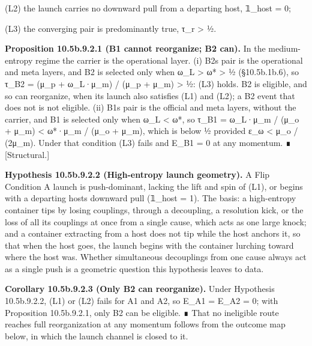 \documentclass[
]{article}
\begin{document}
(L2) the launch carries no downward pull from a departing host, 𝟙\_host
= 0;

(L3) the converging pair is predominantly true, τ\_r \textgreater{} ½.

\textbf{Proposition 10.5b.9.2.1 (B1 cannot reorganize; B2 can).} In the
medium-entropy regime the carrier is the operational layer. (i)
B2\textquotesingle s pair is the operational and meta layers, and B2 is
selected only when ω\_L \textgreater{} ω* \textgreater{} ½
(§10.5b.1b.6), so τ\_B2 = (μ\_p + ω\_L·μ\_m) / (μ\_p + μ\_m)
\textgreater{} ½: (L3) holds. B2 is eligible, and so can reorganize,
when its launch also satisfies (L1) and (L2); a B2 event that does not
is not eligible. (ii) B1\textquotesingle s pair is the official and meta
layers, without the carrier, and B1 is selected only when ω\_L
\textless{} ω*, so τ\_B1 = ω\_L·μ\_m / (μ\_o + μ\_m) \textless{} ω*·μ\_m
/ (μ\_o + μ\_m), which is below ½ provided ε\_ω \textless{} μ\_o /
(2μ\_m). Under that condition (L3) fails and E\_B1 = 0 at any momentum.
∎ {[}Structural.{]}

\textbf{Hypothesis 10.5b.9.2.2 (High-entropy launch geometry).} A Flip
Condition A launch is push-dominant, lacking the lift and spin of (L1),
or begins with a departing host\textquotesingle s downward pull (𝟙\_host
= 1). The basis: a high-entropy container tips by losing couplings,
through a decoupling, a resolution kick, or the loss of all its
couplings at once from a single cause, which acts as one large knock;
and a container extracting from a host does not tip while the host
anchors it, so that when the host goes, the launch begins with the
container lurching toward where the host was. Whether simultaneous
decouplings from one cause always act as a single push is a geometric
question this hypothesis leaves to data.

\textbf{Corollary 10.5b.9.2.3 (Only B2 can reorganize).} Under
Hypothesis 10.5b.9.2.2, (L1) or (L2) fails for A1 and A2, so E\_A1 =
E\_A2 = 0; with Proposition 10.5b.9.2.1, only B2 can be eligible. ∎ That
no ineligible route reaches full reorganization at any momentum follows
from the outcome map below, in which the launch channel is closed to it.
\end{document}

